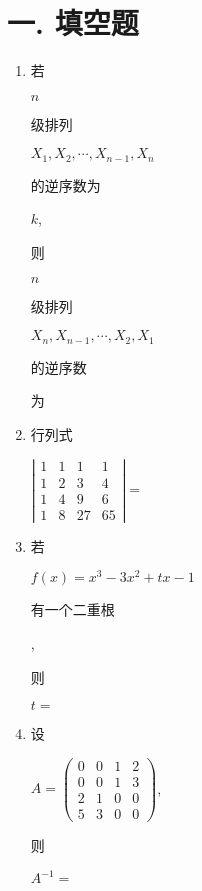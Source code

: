 \documentclass[10pt]{article}
\begin{document}
\section{一. 填空题}
\begin{enumerate}
  \item \begin{CJK}{UTF8}{mj}若\end{CJK} $n$ \begin{CJK}{UTF8}{mj}级排列\end{CJK} $X_{1}, X_{2}, \cdots, X_{n-1}, X_{n}$ \begin{CJK}{UTF8}{mj}的逆序数为\end{CJK} $k$, \begin{CJK}{UTF8}{mj}则\end{CJK} $n$ \begin{CJK}{UTF8}{mj}级排列\end{CJK} $X_{n}, X_{n-1}, \cdots, X_{2}, X_{1}$ \begin{CJK}{UTF8}{mj}的逆序数\end{CJK} \begin{CJK}{UTF8}{mj}为\end{CJK}

  \item \begin{CJK}{UTF8}{mj}行列式\end{CJK} $\left|\begin{array}{cccc}1 & 1 & 1 & 1 \\ 1 & 2 & 3 & 4 \\ 1 & 4 & 9 & 6 \\ 1 & 8 & 27 & 65\end{array}\right|=$

  \item \begin{CJK}{UTF8}{mj}若\end{CJK} $f(x)=x^{3}-3 x^{2}+t x-1$ \begin{CJK}{UTF8}{mj}有一个二重根\end{CJK}, \begin{CJK}{UTF8}{mj}则\end{CJK} $t=$

  \item \begin{CJK}{UTF8}{mj}设\end{CJK} $A=\left(\begin{array}{llll}0 & 0 & 1 & 2 \\ 0 & 0 & 1 & 3 \\ 2 & 1 & 0 & 0 \\ 5 & 3 & 0 & 0\end{array}\right)$, \begin{CJK}{UTF8}{mj}则\end{CJK} $A^{-1}=$


\end{enumerate}
\end{document}
